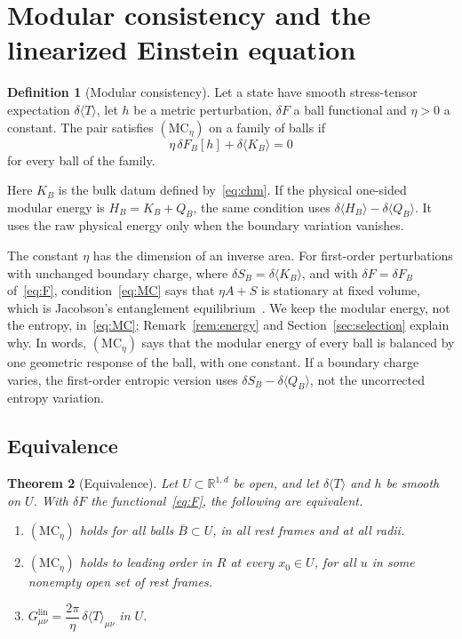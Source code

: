 \documentclass[12pt]{article}
\newtheorem{theorem}{Theorem}[section]
\theoremstyle{definition}
\newtheorem{definition}[theorem]{Definition}
\theoremstyle{remark}
\newcommand{\Glin}{G^{\mathrm{lin}}}
\newcommand{\dT}{\delta\langle T\rangle}
\newcommand{\ev}[1]{\langle #1\rangle}
\begin{document}
\section{Modular consistency and the linearized Einstein equation}\label{sec:einstein}

\begin{definition}[Modular consistency]\label{def:MC}
Let a state have smooth stress-tensor expectation \(\dT\), let \(h\) be a metric
perturbation, \(\delta F\) a ball functional and \(\eta>0\) a constant. The pair satisfies
\((\mathrm{MC}_\eta)\) on a family of balls if
\begin{equation}\label{eq:MC}
\eta\,\delta F_B[h]+\delta\ev{K_B}=0
\end{equation}
for every ball of the family.
\end{definition}

Here \(K_B\) is the bulk datum defined by~\eqref{eq:chm}. If the physical one-sided
modular energy is \(H_B=K_B+Q_B\), the same condition uses
\(\delta\ev{H_B}-\delta\ev{Q_B}\). It uses the raw physical energy only when the
boundary variation vanishes.

The constant \(\eta\) has the dimension of an inverse area. For first-order perturbations
with unchanged boundary charge, where \(\delta S_B=\delta\ev{K_B}\), and with
\(\delta F=\delta F_B\) of~\eqref{eq:F},
condition~\eqref{eq:MC} says that \(\eta A+S\) is stationary at fixed volume, which is
Jacobson's entanglement equilibrium~\cite{Jacobson2016}. We keep the modular energy, not
the entropy, in~\eqref{eq:MC}; Remark~\ref{rem:energy} and Section~\ref{sec:selection}
explain why. In words, \((\mathrm{MC}_\eta)\) says that the modular energy of every ball is
balanced by one geometric response of the ball, with one constant.
If a boundary charge varies, the first-order entropic version uses
\(\delta S_B-\delta\ev{Q_B}\), not the uncorrected entropy variation.

\subsection{Equivalence}\label{subsec:equivalence}

\begin{theorem}[Equivalence]\label{thm:equivalence}
Let \(U\subset\mathbb R^{1,d}\) be open, and let \(\dT\) and \(h\) be smooth on \(U\). With
\(\delta F\) the functional~\eqref{eq:F}, the following are equivalent.
\begin{enumerate}[label=(\alph*),leftmargin=2em,itemsep=1pt]
\item \((\mathrm{MC}_\eta)\) holds for all balls \(\overline B\subset U\), in all rest frames and at all
radii.
\item \((\mathrm{MC}_\eta)\) holds to leading order in \(R\) at every \(x_0\in U\), for all
\(u\) in some nonempty open set of rest frames.
\item \(\Glin_{\mu\nu}=\dfrac{2\pi}{\eta}\,\dT_{\mu\nu}\) in \(U\).
\end{enumerate}
\end{theorem}
\end{document}
